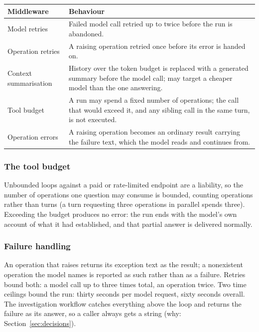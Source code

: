 \documentclass[11pt,a4paper]{article}
\begin{document}
\begin{table}[H]
\centering
\small
\begin{tabular}{|p{32mm}|p{95mm}|}
\hline
\textbf{Middleware} & \textbf{Behaviour} \\
\hline
Model retries & Failed model call retried up to twice before the run is abandoned. \\
\hline
Operation retries & A raising operation retried once before its error is handed on. \\
\hline
Context summarisation & History over the token budget is replaced with a generated
  summary before the model call; may target a cheaper model than the one answering. \\
\hline
Tool budget & A run may spend a fixed number of operations; the call that would
  exceed it, and any sibling call in the same turn, is not executed. \\
\hline
Operation errors & A raising operation becomes an ordinary result carrying the
  failure text, which the model reads and continues from. \\
\hline
\end{tabular}
\end{table}

\subsubsection{The tool budget}

Unbounded loops against a paid or rate-limited endpoint are a liability, so the
number of operations one question may consume is bounded, counting operations
rather than turns (a turn requesting three operations in parallel spends three).
Exceeding the budget produces no error: the run ends with the model's own account
of what it had established, and that partial answer is delivered normally.

\subsubsection{Failure handling}

An operation that raises returns its exception text as the result; a nonexistent
operation the model names is reported as such rather than as a failure. Retries bound both: a
model call up to three times total, an operation twice. Two time ceilings bound the
run: thirty seconds per model request, sixty seconds overall. The investigation
workflow catches everything above the loop and returns the failure as its answer,
so a caller always gets a string (why: Section~\ref{sec:decisions}).
\end{document}
